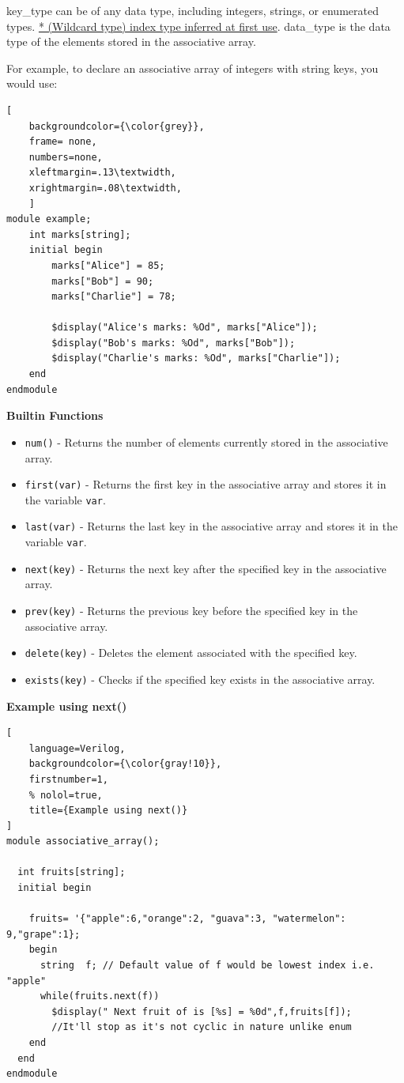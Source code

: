 \documentclass[12pt, a4paper]{article}
\begin{document}
key\_type can be of any data type, including integers, strings, or enumerated types. \ul{* (Wildcard type) index type inferred at first use}.
data\_type is the data type of the elements stored in the associative array.

\vspace{0.5em}

For example, to declare an associative array of integers with string keys, you would use:
\begin{lstlisting}[
    backgroundcolor={\color{grey}},
    frame= none,
    numbers=none,
    xleftmargin=.13\textwidth,
    xrightmargin=.08\textwidth, 
    ]
module example;
    int marks[string];
    initial begin
        marks["Alice"] = 85;
        marks["Bob"] = 90;
        marks["Charlie"] = 78;
        
        $display("Alice's marks: %Od", marks["Alice"]);
        $display("Bob's marks: %Od", marks["Bob"]);
        $display("Charlie's marks: %Od", marks["Charlie"]);
    end
endmodule
\end{lstlisting}

\textbf{Builtin Functions}
\vspace{0.2em}
\begin{itemize}[nosep]
    \item \texttt{num()} - Returns the number of elements currently stored in the associative array.
    \item \texttt{first(var)} - Returns the first key in the associative array and stores it in the variable \texttt{var}.
    \item \texttt{last(var)} - Returns the last key in the associative array and stores it in the variable \texttt{var}.
    \item \texttt{next(key)} - Returns the next key after the specified key in the associative array.
    \item \texttt{prev(key)} - Returns the previous key before the specified key in the associative array.
    \item \texttt{delete(key)} - Deletes the element associated with the specified key.
    \item \texttt{exists(key)} - Checks if the specified key exists in the associative array.
\end{itemize}

\textbf{Example using next()}

\begin{lstlisting}[
    language=Verilog,
    backgroundcolor={\color{gray!10}},
    firstnumber=1,
    % nolol=true,
    title={Example using next()}
]
module associative_array();

  int fruits[string];  
  initial begin
    
    fruits= '{"apple":6,"orange":2, "guava":3, "watermelon": 9,"grape":1};
    begin
      string  f; // Default value of f would be lowest index i.e. "apple"
      while(fruits.next(f))
        $display(" Next fruit of is [%s] = %0d",f,fruits[f]);
        //It'll stop as it's not cyclic in nature unlike enum
    end
  end
endmodule
\end{lstlisting}
\end{document}
